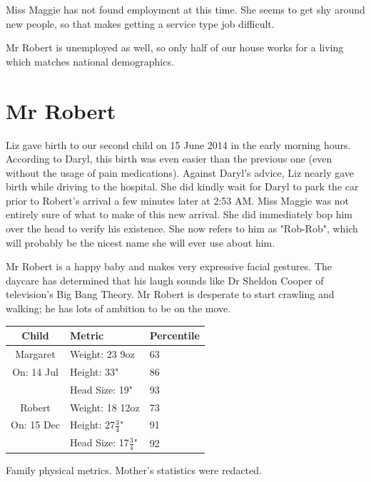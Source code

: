 \documentclass{article}
\makeatletter
\newenvironment{tablehere}
  {\def\@captype{table}}
  {}
\makeatother
\begin{document}
\begin{multicols}{2}
Miss Maggie has not found employment at this time.  She seems to get shy 
around new people, so that makes getting a service type job difficult.  

Mr Robert is unemployed as well, so only half of our house works for a 
living which matches national demographics.

\section{Mr Robert}

Liz gave birth to our second child on 15 June 2014 in the early morning 
hours.  According to Daryl, this birth was even easier than the previous 
one (even without the usage of pain medications).  
Against Daryl's advice, Liz nearly gave birth while driving to the 
hospital.  She did kindly wait for Daryl to park the car prior to Robert's 
arrival a few minutes later at 2:53 AM.  Miss Maggie was not entirely sure 
of what to make of this new arrival. She did immediately bop him over the 
head to verify his existence.  She now refers to him as "Rob-Rob", which 
will probably be the nicest name she will ever use about him.  

Mr Robert is a happy baby and makes very expressive facial gestures.  The 
daycare has determined that his laugh sounds like Dr Sheldon Cooper of 
television's Big Bang Theory.  Mr Robert is desperate to start crawling
and walking; he has lots of ambition to be on the move.

\begin{tablehere}
 \begin{center}
  \begin{tabular}{|c|l|l|}
   \multicolumn{1}{c}{Child} &
   \multicolumn{1}{l}{Metric} &
   \multicolumn{1}{l}{Percentile} \\ \hline \hline
   Margaret & Weight: 23 9oz & 63 \\
   On: 14 Jul & Height: 33" & 86 \\
    & Head Size: 19" & 93 \\
   Robert & Weight: 18 12oz & 73 \\
   On: 15 Dec & Height: 27$\frac{3}{4}$" & 91 \\
    & Head Size: 17$\frac{3}{4}$" & 92 \\
\hline
  \end{tabular}
 \end{center}
 \caption{Family physical metrics. Mother's statistics were redacted.}
 \label{table:metrics}
\end{tablehere}


\end{multicols}
\end{document}
